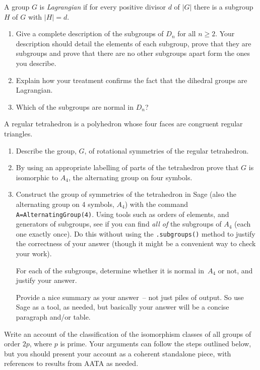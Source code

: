 \documentclass[oneside,10pt]{amsart}
\begin{document}
\noindent
A group $G$ is \emph{Lagrangian} if for every positive divisor $d$ of $|G|$ there is a subgroup $H$ of $G$ with $|H| = d$.
\begin{enumerate}[label=(\alph*)]
\item
Give a complete description of the subgroups of $D_n$ for all $n \geq 2$. Your description should detail the elements of each subgroup, prove that they are subgroups and prove that there are no other subgroups apart form the ones you describe.
\item
Explain how your treatment confirms the fact that the dihedral groups are Lagrangian.
\item
Which of the subgroups are normal in $D_n$?
\end{enumerate}
A regular tetrahedron is a polyhedron whose four faces are congruent regular triangles.
\begin{enumerate}[label=(\alph*)]
\item
Describe the group, $G$, of rotational symmetries of the regular tetrahedron.
\item
By using an appropriate labelling of parts of the tetrahedron prove that $G$ is isomorphic to $A_4$, the alternating group on four symbols.
\item
Construct the group of symmetries of the tetrahedron in Sage (also the alternating group on 4 symbols, \(A_4\)) with the command \texttt{A=AlternatingGroup(4)}.  Using tools such as orders of elements, and generators of subgroups, see if you can find \emph{all of} the subgroups of \(A_4\) (each one exactly once).  Do this without using the \texttt{.subgroups()} method to justify the correctness of your answer (though it might be a convenient way to check your work).%

For each of the subgroups, determine whether it is normal in~$A_4$ or not, and justify your answer.

Provide a nice summary as your answer~-- not just piles of output.  So use Sage as a tool, as needed, but basically your answer will be a concise paragraph and/or table.
\end{enumerate}
\newpage
{}
Write an account of the classification of the isomorphism classes of all groups of order $2p$, where $p$ is prime. Your arguments can follow the steps outlined below, but you should present your account as a coherent standalone piece, with references to results from AATA as needed.
\end{document}
